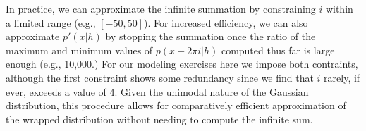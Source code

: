 \documentclass[12pt]{article}
\begin{document}
In practice, we can approximate the infinite summation by constraining $i$
within a limited range (e.g., $[-50,50]$). For increased efficiency, we can also
approximate $p'(x|h)$ by stopping the summation once the ratio of the maximum
and minimum values of $p(x + 2\pi i|h)$ computed thus far is large enough (e.g.,
10,000.) For our modeling exercises here we impose both contraints, although the
first constraint shows some redundancy since we find that $i$ rarely, if ever,
exceeds a value of 4. Given the unimodal nature of the Gaussian distribution,
this procedure allows for comparatively efficient approximation of the wrapped
distribution without needing to compute the infinite sum.
\end{document}
